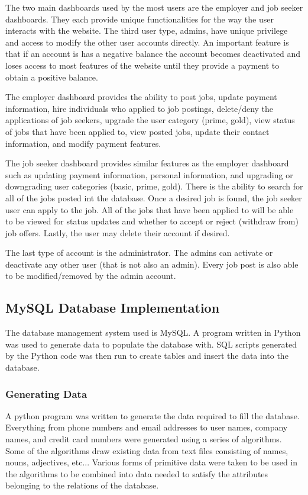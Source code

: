 \documentclass[11pt]{article}
\begin{document}
The two main dashboards used by the most users are the employer and job seeker dashboards. They each provide unique functionalities for the way the user interacts with the website. The third user type, admins, have unique privilege and access to modify the other user accounts directly. An important feature is that if an account is has a negative balance the account becomes deactivated and loses access to most features of the website until they provide a payment to obtain a positive balance. \par
The employer dashboard provides the ability to post jobs, update payment information, hire individuals who applied to job postings, delete/deny the applications of job seekers, upgrade the user category (prime, gold), view status of jobs that have been applied to, view posted jobs, update their contact information, and modify payment features. \par 
The job seeker dashboard provides similar features as the employer dashboard such as updating payment information, personal information, and upgrading or downgrading user categories (basic, prime, gold). There is the ability to search for all of the jobs posted int the database. Once a desired job is found, the job seeker user can apply to the job. All of the jobs that have been applied to will be able to be viewed for status updates and whether to accept or reject (withdraw from) job offers. Lastly, the user may delete their account if desired. \par
The last type of account is the administrator. The admins can activate or deactivate any other user (that is not also an admin).  Every job post is also able to be modified/removed by the admin account.

\subsection{MySQL Database Implementation}

The database management system used is MySQL. A program written in Python was used to generate data to populate the database with. SQL scripts generated by the Python code was then run to create tables and insert the data into the database.

\subsubsection{Generating Data}

A python program was written to generate the data required to fill the database. Everything from phone numbers and email addresses to user names, company names, and credit card numbers were generated using a series of algorithms. Some of the algorithms draw existing data from text files consisting of names, nouns, adjectives, etc... Various forms of primitive data were taken to be used in the algorithms to be combined into data needed to satisfy the attributes belonging to the relations of the database.
\end{document}
